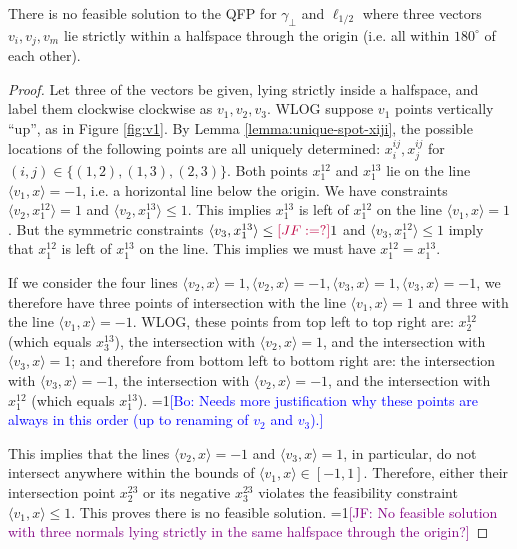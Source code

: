 \documentclass[anon]{colt2020} %
\newcommand{\Comments}{1}
\newcommand{\mynote}[2]{\ifnum\Comments=1\textcolor{#1}{#2}\fi}
\newcommand{\jessie}[1]{\mynote{purple}{[JF: #1]}}
\newcommand{\bo}[1]{\mynote{blue}{[Bo: #1]}}
\newcommand{\inprod}[2]{\langle #1, #2 \rangle}%
\begin{document}
\begin{lemma} \label{lemma:180-degree-no-three}
  There is no feasible solution to the QFP for $\gamma_{\bot}$ and $\ell_{1/2}$ where three vectors $v_i,v_j,v_m$ lie strictly within a halfspace through the origin (i.e. all within $180^{\circ}$ of each other).
\end{lemma}
\begin{proof}
  Let three of the vectors be given, lying strictly inside a halfspace, and label them clockwise clockwise as $v_1,v_2,v_3$.
  WLOG suppose $v_1$ points vertically ``up'', as in Figure \ref{fig:v1}.
  By Lemma \ref{lemma:unique-spot-xiji}, the possible locations of the following points are all uniquely determined: $x^{ij}_i, x^{ij}_j$ for $(i,j) \in \{(1,2),(1,3),(2,3)\}$.
  Both points $x^{12}_1$ and $x^{13}_1$ lie on the line $\inprod{v_1}{x} = -1$, i.e. a horizontal line below the origin.
  We have constraints $\inprod{v_2}{x^{12}_1} = 1$ and $\inprod{v_2}{x^{13}_1} \leq 1$.
  This implies $x^{13}_1$ is left of $x^{12}_1$ on the line $\inprod{v_1}{x} = 1$. 
  But the symmetric constraints $\inprod{v_3}{x^{13}_1} \leq \jessie{=?} 1$ and $\inprod{v_3}{x^{12}_1} \leq 1$ imply that $x^{12}_1$ is left of $x^{13}_1$ on the line.
  This implies we must have $x^{12}_1 = x^{13}_1$.

  If we consider the four lines $\inprod{v_2}{x}=1, \inprod{v_2}{x}=-1, \inprod{v_3}{x}=1, \inprod{v_3}{x}=-1$, we therefore have three points of intersection with the line $\inprod{v_1}{x}=1$ and three with the line $\inprod{v_1}{x}=-1$. 
  WLOG, these points from top left to top right are: $x^{12}_2$ (which equals $x^{13}_3$), the intersection with $\inprod{v_2}{x}=1$, and the intersection with $\inprod{v_3}{x}=1$; and therefore from bottom left to bottom right are: the intersection with $\inprod{v_3}{x}=-1$, the intersection with $\inprod{v_2}{x}=-1$, and the intersection with $x^{12}_1$ (which equals $x^{13}_1$).
  \bo{Needs more justification why these points are always in this order (up to renaming of $v_2$ and $v_3$).}

  This implies that the lines $\inprod{v_2}{x}=-1$ and $\inprod{v_3}{x}=1$, in particular, do not intersect anywhere within the bounds of $\inprod{v_1}{x} \in [-1,1]$.
  Therefore, either their intersection point $x^{23}_2$ or its negative $x^{23}_3$ violates the feasibility constraint $\inprod{v_1}{x} \leq 1$.
  This proves there is no feasible solution.
  \jessie{No feasible solution with three normals lying strictly in the same halfspace through the origin?}
\end{proof}
\end{document}
